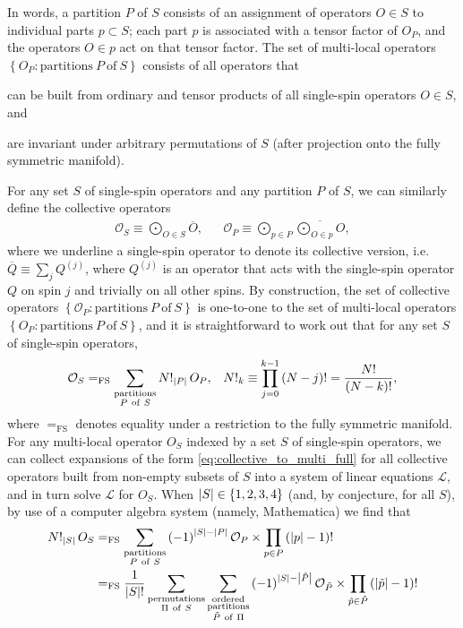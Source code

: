 \documentclass[nofootinbib,notitlepage,11pt]{revtex4-2}
\renewcommand{\t}{\text} %
\newcommand{\f}[2]{\dfrac{#1}{#2}} %
\newcommand{\p}[1]{\left(#1\right)} %
\renewcommand{\set}[1]{\left\{#1\right\}} %
\newcommand{\1}{\mathds{1}}
\renewcommand{\L}{\mathcal{L}}
\renewcommand{\O}{\mathcal{O}}
\renewcommand{\P}{\mathcal{P}}
\newcommand{\EQFS}{=_{\text{FS}}}
\newcommand{\col}{\overline}
\begin{document}
In words, a partition $P$ of $S$ consists of an assignment of
operators $O\in S$ to individual parts $p\subset S$; each part $p$ is
associated with a tensor factor of $O_P$, and the operators $O\in p$
act on that tensor factor.  The set of multi-local operators
$\set{O_P:\t{partitions}~P~\t{of}~S}$ consists of all operators that
\begin{enumerate*}
\item can be built from ordinary and tensor products of all
  single-spin operators $O\in S$, and
\item are invariant under arbitrary permutations of $S$ (after
  projection onto the fully symmetric manifold).
\end{enumerate*}
For any set $S$ of single-spin operators and any partition $P$ of $S$,
we can similarly define the collective operators
\begin{align}
  \O_S \equiv \bigodot_{O\in S} \col{O},
  &&
  \O_P \equiv \bigodot_{p\in P} \col{\textstyle\bigodot_{O\in p} O},
\end{align}
where we underline a single-spin operator to denote its collective
version, i.e.~$\col{Q}\equiv\sum_j Q^{(j)}$, where $Q^{(j)}$ is an
operator that acts with the single-spin operator $Q$ on spin $j$ and
trivially on all other spins.  By construction, the set of collective
operators $\set{\O_P:\t{partitions}~P~\t{of}~S}$ is one-to-one to the
set of multi-local operators $\set{O_P:\t{partitions}~P~\t{of}~S}$,
and it is straightforward to work out that for any set $S$ of
single-spin operators,
\begin{align}
  \O_S
  \EQFS \sum_{\substack{\t{partitions}\\P~\t{of}~S}}
  N!_{\abs{P}}\, O_P,
  &&
  N!_k \equiv \prod_{j=0}^{k-1}\p{N-j}! = \f{N!}{\p{N-k}!},
  \label{eq:collective_to_multi_full}
\end{align}
where $\EQFS$ denotes equality under a restriction to the fully
symmetric manifold.  For any multi-local operator $O_S$ indexed by a
set $S$ of single-spin operators, we can collect expansions of the
form \eqref{eq:collective_to_multi_full} for all collective operators
built from non-empty subsets of $S$ into a system of linear equations
$\L$, and in turn solve $\L$ for $O_S$.  When
$\abs{S}\in\set{1,2,3,4}$ (and, by conjecture, for all $S$), by use of
a computer algebra system (namely, Mathematica) we find that
\begin{align}
  N!_{\abs{S}}\, O_S
  &\EQFS \sum_{\substack{\t{partitions}\\P~\t{of}~S}}
  \p{-1}^{\abs{S}-\abs{P}} \O_P \times \prod_{p\in P}\p{\abs{p}-1}!
  \label{eq:multi_to_collective_full} \\
  &\EQFS \f1{\abs{S}!} \sum_{\substack{\t{permutations}\\\Pi~\t{of}~S}}
  \sum_{\substack{\t{ordered}\\\t{partitions}\\\tilde P~\t{of}~\Pi}}
  \p{-1}^{\abs{S}-\abs{\tilde P}} \O_{\tilde P}
  \times \prod_{\tilde p\in\tilde P} \p{\abs{\tilde p}-1}!
  \label{eq:multi_to_collective_full_simp}
\end{align}
\end{document}
